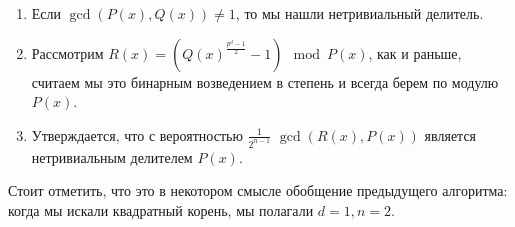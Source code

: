 \begin{enumerate}
\begin{enumerate}
			\item 
				Если $\gcd(P(x), Q(x)) \ne 1$, то мы нашли нетривиальный делитель.
			
			\item
				Рассмотрим $R(x) = (Q(x)^\frac{p^d-1}{2}-1) \mod P(x)$, как и раньше, считаем мы это бинарным возведением в степень и всегда берем по модулю $P(x)$.

			\item
				Утверждается, что с вероятностью $\frac{1}{2^{n-1}}$ $\gcd(R(x), P(x))$ является нетривиальным делителем $P(x)$.
		\end{enumerate}

		Стоит отметить, что это в некотором смысле обобщение предыдущего алгоритма: когда мы искали квадратный корень, мы полагали $d=1, n = 2$.
		
\end{enumerate}                                        	                             	
